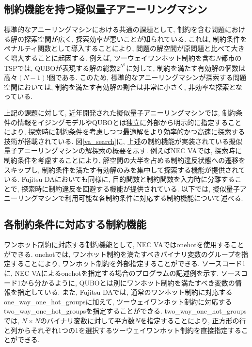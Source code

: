 \documentclass[submit,techrep,noauthor]{ipsj}
\begin{document}
\subsection{制約機能を持つ疑似量子アニーリングマシン}
標準的なアニーリングマシンにおける共通の課題として, 制約を含む問題における解の探索空間が広く, 探索効率が悪いことが知られている\cite{takano}. これは, 制約条件をペナルティ関数として導入することにより, 問題の解空間が原問題と比べて大きく増大することに起因する. 例えば, ツーウェイワンホット制約を含む$N$都市のTSPでは, QUBOが表現する解の総数$2^{N^{2}}$に対して, 制約を満たす有効解の個数は高々$(N-1)!$個である. このため, 標準的なアニーリングマシンが探索する問題空間においては, 制約を満たす有効解の割合は非常に小さく, 非効率な探索となっている.

上記の課題に対して, 近年開発された擬似量子アニーリングマシンでは, 制約条件の情報をイジングモデルやQUBOとは独立に外部から明示的に指定することにより, 探索時に制約条件を考慮しつつ最適解をより効率的かつ高速に探索する技術が搭載されている. 図\ref{va_search}に, 上述の制約機能が実装されている擬似量子アニーリングマシンの解探索の概要を示す. 例えばNEC VAでは, 探索時に制約条件を考慮することにより, 解空間の大半を占める制約違反状態への遷移をスキップし, 制約条件を満たす有効解のみを集中して探索する機能が提供されている. Fujitsu DAにおいても同様に, 目的関数と制約関数を入力時に分離することで, 探索時に制約違反を回避する機能が提供されている. 以下では, 擬似量子アニーリングマシンで利用可能な各制約条件に対応する制約機能について述べる. 

\subsection{各制約条件に対応する制約機能}

ワンホット制約に対応する制約機能として, NEC VAではonehotを使用することができる. onehotでは, ワンホット制約を満たすべきバイナリ変数のグループを指定することにより, ワンホット制約を外部指定することができる. ソースコード1に, NEC VAによるonehotを指定する場合のプログラムの記述例を示す. ソースコード1から分かるように, QUBOとは別にワンホット制約を満たすべき変数の情報を指定している. また, Fujitsu DAでは, 通常のワンホット制約に対応するone\_way\_one\_hot\_groupsに加えて, ツーウェイワンホット制約に対応するtwo\_way\_one\_hot\_groupsを指定することができる. two\_way\_one\_hot\_groupsでは, $N\times N$のバイナリ変数に対して平方数$N$を指定することにより, 正方形の行と列からそれぞれ1つの1を選択するツーウェイワンホット制約を直接指定することができる.
\end{document}
